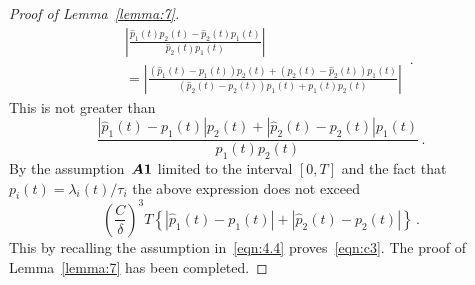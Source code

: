 \documentclass[lettersize,journal,onecolumn]{IEEEtran}
\theoremstyle{definition}
\newcommand{\assumption}[1]{{\rm \boldsymbol{A#1}}}
\begin{document}
\begin{proof}[Proof of Lemma~\ref{lemma:7}]
\begin{equation*}
\begin{split}
			& \left|
			\frac{
				\widehat{p}_{1}(t)p_{2}(t)-\widehat{p}_{2}(t)p_{1}(t)
			}{
				\widehat{p}_{2}(t)p_{1}(t)
			}
			\right| \\
			& = \left|
			\frac{
				\left(
				\widehat{p}_{1}(t)-p_{1}(t)
				\right)p_{2}(t) +
				\left(
				p_{2}(t)-\widehat{p}_{2}(t)
				\right)p_{1}(t)
			}{
				\left(
				\widehat{p}_{2}(t)-p_{2}(t)
				\right)p_{1}(t) + p_{1}(t)p_{2}(t)
			}
			\right|
		\end{split}
		\,.
	\end{equation*}
	This is not greater than
	\begin{equation*}
		\frac{
			\left|
			\widehat{p}_{1}(t)-p_{1}(t)
			\right|p_{2}(t) +
			\left|
			\widehat{p}_{2}(t)-p_{2}(t)
			\right|p_{1}(t)
		}{
			p_{1}(t)p_{2}(t)
		}
		\,.
	\end{equation*}
	By the assumption~$\assumption{1}$ limited to the interval $[0,T]$ and the fact 
	that \mbox{$
		p_{i}(t) = \lambda_{i}(t)/\tau_{i}
		$} the above expression does not exceed
	\begin{equation*}
		\left(\frac{C}{\delta}\right)^{3}T\left\{
		\left|
		\widehat{p}_{1}(t)-p_{1}(t)
		\right| + 
		\left|
		\widehat{p}_{2}(t)-p_{2}(t)
		\right|
		\right\}
		\,.
	\end{equation*}
	This by recalling the assumption in~\eqref{eqn:4.4} proves~\eqref{eqn:c3}. The 
	proof of Lemma~\ref{lemma:7} has been completed.
\end{proof}

\section{}
\label{app:D}
\end{document}

